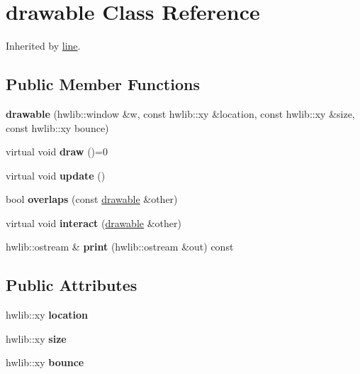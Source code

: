 \hypertarget{classdrawable}{}\section{drawable Class Reference}
\label{classdrawable}


Inherited by \hyperlink{classline}{line}.

\subsection*{Public Member Functions}
\begin{DoxyCompactItemize}
\item 
\mbox{\label{classdrawable_a4c01d095b99cc8c35785eb3a5bbc4b27}} 
{\bfseries drawable} (hwlib\+::window \&w, const hwlib\+::xy \&location, const hwlib\+::xy \&size, const hwlib\+::xy bounce)
\item 
\mbox{\label{classdrawable_a5462dc7c98484f05fcaa4e30a55e953a}} 
virtual void {\bfseries draw} ()=0
\item 
\mbox{\label{classdrawable_a483266f1539329edc7e9ffa5068cdca7}} 
virtual void {\bfseries update} ()
\item 
\mbox{\label{classdrawable_a597f96aa3ae294757d9816c741cfc00a}} 
bool {\bfseries overlaps} (const \hyperlink{classdrawable}{drawable} \&other)
\item 
\mbox{\label{classdrawable_ac36f995bf614accb3381db74e5f2b030}} 
virtual void {\bfseries interact} (\hyperlink{classdrawable}{drawable} \&other)
\item 
\mbox{\label{classdrawable_aef2780984d1b758e846630262f348b53}} 
hwlib\+::ostream \& {\bfseries print} (hwlib\+::ostream \&out) const
\end{DoxyCompactItemize}
\subsection*{Public Attributes}
\begin{DoxyCompactItemize}
\item 
\mbox{\label{classdrawable_adcafaaa2c4e81dd0cc94f9188dd89bdf}} 
hwlib\+::xy {\bfseries location}
\item 
\mbox{\label{classdrawable_a76058b08b10b233601d7d8c99951dd80}} 
hwlib\+::xy {\bfseries size}
\item 
\mbox{\label{classdrawable_aa50339124800c62fd6818e698bc174ef}} 
hwlib\+::xy {\bfseries bounce}
\end{DoxyCompactItemize}
